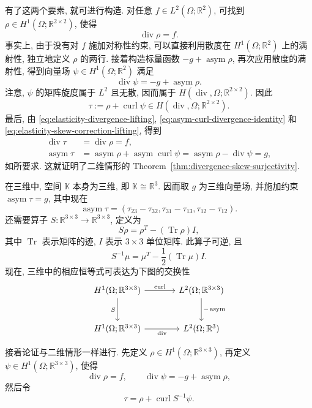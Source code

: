 \begin{Proof}
有了这两个要素, 就可进行构造. 对任意 $f\in L^2(\Omega;\mathbb R^2)$, 可找到 $\rho\in H^1(\Omega;\mathbb R^{2\times2})$, 使得
\begin{equation}\label{eq:elasticity-divergence-lifting}
\operatorname{div}\rho=f.
\end{equation}
事实上, 由于没有对 $f$ 施加对称性约束, 可以直接利用散度在 $H^1(\Omega;\mathbb R^2)$ 上的满射性, 独立地定义 $\rho$ 的两行. 接着构造标量函数 $-g+\operatorname{asym}\rho$, 再次应用散度的满射性, 得到向量场 $\psi\in H^1(\Omega;\mathbb R^2)$ 满足
\begin{equation}\label{eq:elasticity-skew-correction-lifting}
\operatorname{div}\psi=-g+\operatorname{asym}\rho.
\end{equation}
注意, $\psi$ 的矩阵旋度属于 $L^2$ 且无散, 因而属于 $H(\operatorname{div},\Omega;\mathbb R^{2\times2})$. 因此
\[
\tau:=\rho+\operatorname{curl}\psi\in H(\operatorname{div},\Omega;\mathbb R^{2\times2}).
\]
最后, 由 \eqref{eq:elasticity-divergence-lifting}, \eqref{eq:asym-curl-divergence-identity} 和 \eqref{eq:elasticity-skew-correction-lifting}, 得到
\[
\begin{aligned}
\operatorname{div}\tau&=\operatorname{div}\rho=f,\\
\operatorname{asym}\tau&=\operatorname{asym}\rho+\operatorname{asym}\operatorname{curl}\psi=\operatorname{asym}\rho-\operatorname{div}\psi=g,
\end{aligned}
\]
如所要求. 这就证明了二维情形的 Theorem~\ref{thm:divergence-skew-surjectivity}.

在三维中, 空间 $\mathbb K$ 本身为三维, 即 $\mathbb K\cong\mathbb R^3$. 因而取 $g$ 为三维向量场, 并施加约束 $\operatorname{asym}\tau=g$, 其中现在
\[
\operatorname{asym}\tau=(\tau_{23}-\tau_{32},\tau_{31}-\tau_{13},\tau_{12}-\tau_{12}).
\]
还需要算子 $S:\mathbb R^{3\times3}\to\mathbb R^{3\times3}$, 定义为
\[
S\rho=\rho^T-(\operatorname{Tr}\rho)I,
\]
其中 $\operatorname{Tr}$ 表示矩阵的迹, $I$ 表示 $3\times3$ 单位矩阵. 此算子可逆, 且
\[
S^{-1}\mu=\mu^T-\frac12(\operatorname{Tr}\mu)I.
\]
现在, 三维中的相应恒等式可表达为下图的交换性
\[
\begin{tikzcd}[column sep=large,row sep=large]
H^1(\Omega;\mathbb R^{3\times3})\arrow[r,"\operatorname{curl}"]\arrow[d,"S"']&L^2(\Omega;\mathbb R^{3\times3})\arrow[d,"-\operatorname{asym}"]\\
H^1(\Omega;\mathbb R^{3\times3})\arrow[r,"\operatorname{div}"']&L^2(\Omega;\mathbb R^3)
\end{tikzcd}
\]

接着论证与二维情形一样进行. 先定义 $\rho\in H^1(\Omega;\mathbb R^{3\times3})$, \newline 再定义 $\psi\in H^1(\Omega;\mathbb R^{3\times3})$, 使得
\[
\operatorname{div}\rho=f,\qquad\operatorname{div}\psi=-g+\operatorname{asym}\rho,
\]
然后令
\[
\tau=\rho+\operatorname{curl}S^{-1}\psi.
\]
\end{Proof}

